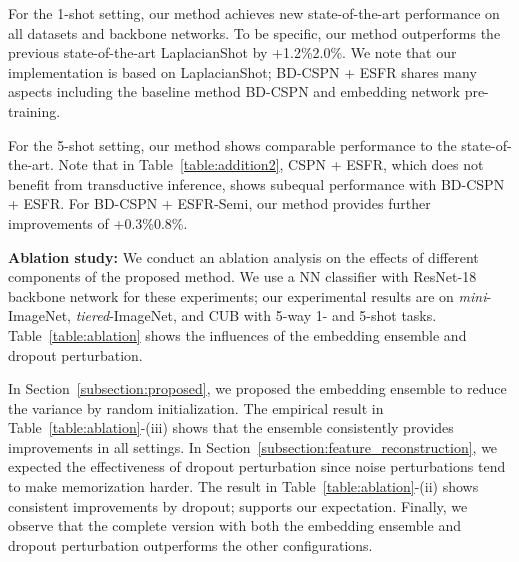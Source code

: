 \documentclass{article}
\begin{document}
For the 1-shot setting, our method achieves new state-of-the-art performance on all datasets and backbone networks. To be specific, our method outperforms the previous state-of-the-art LaplacianShot \cite{LaplacianShot} by +1.2\%2.0\%. We note that our implementation is based on LaplacianShot; BD-CSPN + ESFR shares many aspects including the baseline method BD-CSPN and embedding network pre-training.

For the 5-shot setting, our method shows comparable performance to the state-of-the-art. Note that in Table~\ref{table:addition2}, CSPN + ESFR, which does not benefit from transductive inference, shows subequal performance with  BD-CSPN + ESFR. For BD-CSPN + ESFR-Semi, our method provides further improvements of +0.3\%0.8\%.

\textbf{Ablation study:}
We conduct an ablation analysis on the effects of different components of the proposed method. We use a NN classifier with ResNet-18 backbone network for these experiments; our experimental results are on \textit{mini}-ImageNet, \textit{tiered}-ImageNet, and CUB with 5-way 1- and 5-shot tasks. Table~\ref{table:ablation} shows the influences of the embedding ensemble and dropout perturbation.

In Section~\ref{subsection:proposed}, we proposed the embedding ensemble to reduce the variance by random initialization. The empirical result in Table~\ref{table:ablation}-(iii) shows that the ensemble consistently provides improvements in all settings. In Section~\ref{subsection:feature_reconstruction}, we expected the effectiveness of dropout perturbation since noise perturbations tend to make memorization harder. The result in Table~\ref{table:ablation}-(ii) shows consistent improvements by dropout; supports our expectation. Finally, we observe that the complete version with both the embedding ensemble and dropout perturbation outperforms the other configurations.
\end{document}
